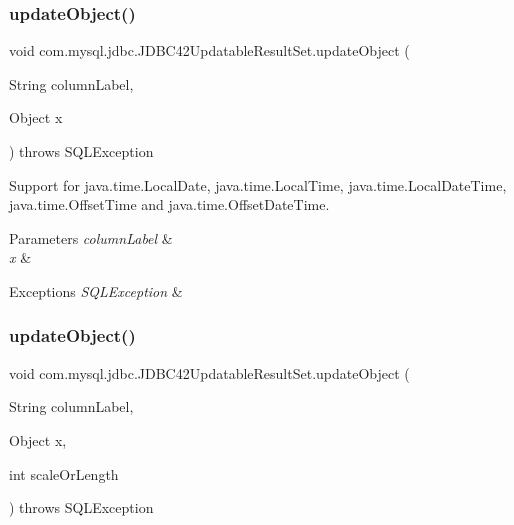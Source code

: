 \subsubsection{\texorpdfstring{update\+Object()}{updateObject()}\hspace{0.1cm}{\footnotesize\ttfamily [3/8]}}
{\footnotesize\ttfamily void com.\+mysql.\+jdbc.\+J\+D\+B\+C42\+Updatable\+Result\+Set.\+update\+Object (\begin{DoxyParamCaption}\item[{String}]{column\+Label,  }\item[{Object}]{x }\end{DoxyParamCaption}) throws S\+Q\+L\+Exception}

Support for java.\+time.\+Local\+Date, java.\+time.\+Local\+Time, java.\+time.\+Local\+Date\+Time, java.\+time.\+Offset\+Time and java.\+time.\+Offset\+Date\+Time.


\begin{DoxyParams}{Parameters}
{\em column\+Label} & \\
\hline
{\em x} & \\
\hline
\end{DoxyParams}

\begin{DoxyExceptions}{Exceptions}
{\em S\+Q\+L\+Exception} & \\
\hline
\end{DoxyExceptions}
\mbox{\label{classcom_1_1mysql_1_1jdbc_1_1_j_d_b_c42_updatable_result_set_a6097b1af95f4724899f3e017e454478e}} 
\subsubsection{\texorpdfstring{update\+Object()}{updateObject()}\hspace{0.1cm}{\footnotesize\ttfamily [4/8]}}
{\footnotesize\ttfamily void com.\+mysql.\+jdbc.\+J\+D\+B\+C42\+Updatable\+Result\+Set.\+update\+Object (\begin{DoxyParamCaption}\item[{String}]{column\+Label,  }\item[{Object}]{x,  }\item[{int}]{scale\+Or\+Length }\end{DoxyParamCaption}) throws S\+Q\+L\+Exception}

